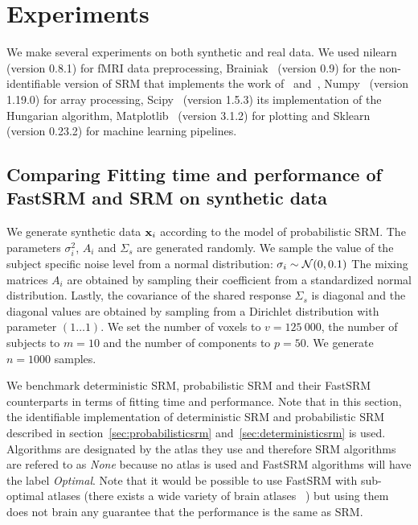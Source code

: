 \documentclass{article}
\newcommand{\bt}[1]{\todo[color=orange, inline=True]{BT: #1}}
\begin{document}
\section{Experiments}
We make several experiments on both synthetic and real data.
%
We used nilearn~\cite{abraham2014machine} (version 0.8.1) for fMRI data preprocessing,
Brainiak~\cite{kumar2020brainiak2} (version 0.9) for the non-identifiable version of SRM that
implements the work of~\cite{chen2015reduced} and~\cite{anderson2016enabling},
Numpy~\cite{harris2020array} (version 1.19.0) for
array processing, Scipy~\cite{2020SciPy-NMeth} (version 1.5.3) its implementation of the
Hungarian algorithm, Matplotlib~\cite{hunter2007matplotlib} (version 3.1.2) for plotting and
Sklearn~\cite{pedregosa2011scikit} (version 0.23.2) for machine learning pipelines.

\subsection{Comparing Fitting time and performance of FastSRM and
  SRM on synthetic data}
We generate synthetic data $\mathbf{x}_i$ according to the model of probabilistic SRM.
%
The parameters $\sigma_i^2$, $A_i$ and $\Sigma_s$ are generated randomly.
%
We sample the value of the subject specific noise level from a normal
distribution: $\sigma_i \sim \mathcal{N}(0, 0.1)$
%
The mixing matrices $A_i$
are obtained by sampling their coefficient from a standardized normal
distribution.
%
Lastly, the covariance of the shared response $\Sigma_s$ is diagonal and the
diagonal values are obtained by sampling from a Dirichlet distribution with
parameter $(1 \dots 1)$.
%
We set the number of voxels to $v=125~000$, the number of subjects to $m=10$ and
the number of components to $p=50$.
%
We generate $n=1000$ samples.
%


We benchmark deterministic SRM, probabilistic SRM and their FastSRM counterparts in terms of fitting time and performance.
%
Note that in this section, the identifiable implementation of deterministic SRM
and probabilistic SRM described in section~\ref{sec:probabilisticsrm}
and~\ref{sec:deterministicsrm} is used. 
%
Algorithms are designated by the atlas they use and therefore SRM algorithms are refered to
as \emph{None} because no atlas is used and FastSRM algorithms will have the
label \emph{Optimal}.
%
Note that it would be possible to use FastSRM with sub-optimal
atlases (there exists a wide variety of brain atlases
~\cite{schaefer2017local, bellec2010multi, mensch2018extracting}) but
using them does not brain any guarantee that the performance is the same as SRM.
%
\end{document}
